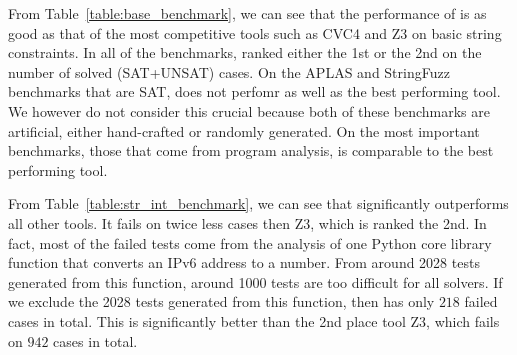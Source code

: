 

From Table~\ref{table:base_benchmark}, we can see that the performance of {\tool} is as good as that of the most competitive tools such as CVC4 and Z3 on basic string constraints. In all of the benchmarks, {\tool} ranked either the 1st or the 2nd on the number of solved (SAT+UNSAT) cases. On the APLAS and StringFuzz benchmarks that are SAT, {\tool} does not perfomr as well as the best performing tool. We however do not consider this crucial because both of these benchmarks are artificial, either hand-crafted or randomly generated. On the most important benchmarks, those that come from program analysis, {\tool} is comparable to the best performing tool.

From Table~\ref{table:str_int_benchmark}, we can see that {\tool} significantly outperforms all other tools. It fails on twice less cases then Z3, which is ranked the 2nd. In fact, most of the failed tests come from the analysis of one Python core library function that converts an IPv6 address to a number. From around 2028 tests generated from this function, around 1000 tests are too difficult for all solvers.  If we exclude the 2028 tests generated from this function, then {\tool} has only $218$ failed cases in total. This is significantly better than the 2nd place tool Z3, which fails on $942$ cases in total.

